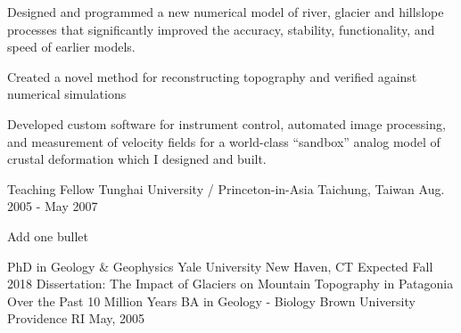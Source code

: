 \documentclass[11pt, letter]{awesome-cv}
\begin{document}
\begin{cventries}
{\begin{cvitems}
        \item {Designed and programmed a new numerical model of river, glacier and hillslope processes that significantly improved the accuracy, stability, functionality, and speed of earlier models.}
        \item {Created a novel method for reconstructing topography and verified against numerical simulations}
        \item{Developed custom software for instrument control, automated image processing, and measurement of velocity fields for a world-class “sandbox” analog model of crustal deformation which I designed and built.}
      \end{cvitems} 
    }
  \cventry
    {Teaching Fellow}
    {Tunghai University / Princeton-in-Asia}
    {Taichung, Taiwan}
    {Aug. 2005 - May 2007}
    {
      \begin{cvitems}
        \item {Add one bullet}
      \end{cvitems} 
    }
\end{cventries}

\begin{cventries}
  \cventry
    {PhD in Geology \& Geophysics}
    {Yale University}
    {New Haven, CT}
    {Expected Fall 2018}
    {Dissertation: The Impact of Glaciers on Mountain Topography in Patagonia Over the Past 10 Million Years}
  \cventry
    {BA in Geology - Biology}
    {Brown University}
    {Providence RI}
    {May, 2005}
    {}
\end{cventries}
\end{document}
